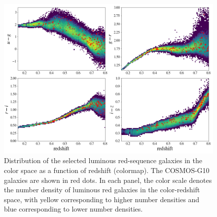 \documentclass[fleqn,usenatbib,useAMS]{mnras}
\begin{document}



\begin{figure}
\includegraphics[width=\textwidth]{figures_tmp/cosmos_color.png}
\caption{\label{fig:cosmos_color}Distribution of the selected luminous red-sequence galaxies in 
the color space as a function of redshift (colormap). The COSMOS-G10 galaxies are shown in red dots. In each panel, the color scale denotes the number density of luminous red galaxies in the color-redshift space, with yellow corresponding to higher number densities and blue corresponding to lower number densities.} 
\end{figure}
\end{document}
